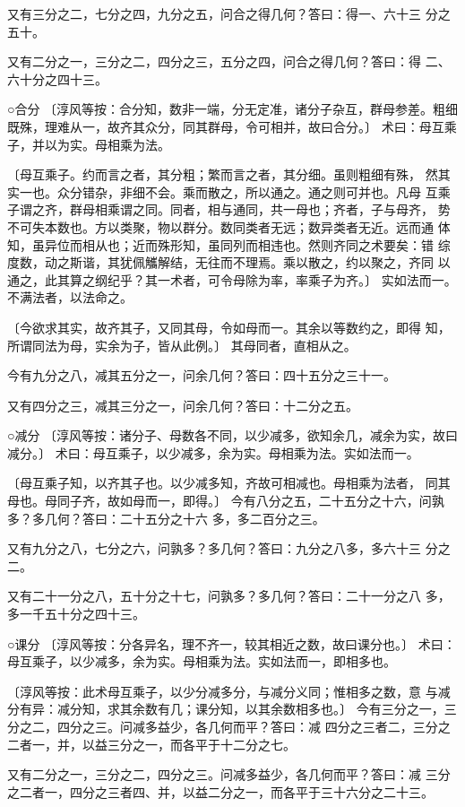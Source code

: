 \documentclass[a4paper,12pt,UTF8,twoside]{ctexbook}
\begin{document}
又有三分之二，七分之四，九分之五，问合之得几何？答曰：得一、六十三 分之五十。

又有二分之一，三分之二，四分之三，五分之四，问合之得几何？答曰：得 二、六十分之四十三。

○合分 〔淳风等按：合分知，数非一端，分无定准，诸分子杂互，群母参差。粗细 既殊，理难从一，故齐其众分，同其群母，令可相并，故曰合分。〕 术曰：母互乘子，并以为实。母相乘为法。

〔母互乘子。约而言之者，其分粗；繁而言之者，其分细。虽则粗细有殊， 然其实一也。众分错杂，非细不会。乘而散之，所以通之。通之则可并也。凡母 互乘子谓之齐，群母相乘谓之同。同者，相与通同，共一母也；齐者，子与母齐， 势不可失本数也。方以类聚，物以群分。数同类者无远；数异类者无近。远而通 体知，虽异位而相从也；近而殊形知，虽同列而相违也。然则齐同之术要矣：错 综度数，动之斯谐，其犹佩觿解结，无往而不理焉。乘以散之，约以聚之，齐同 以通之，此其算之纲纪乎？其一术者，可令母除为率，率乘子为齐。〕 实如法而一。不满法者，以法命之。

〔今欲求其实，故齐其子，又同其母，令如母而一。其余以等数约之，即得 知，所谓同法为母，实余为子，皆从此例。〕 其母同者，直相从之。

今有九分之八，减其五分之一，问余几何？答曰：四十五分之三十一。

又有四分之三，减其三分之一，问余几何？答曰：十二分之五。

○减分 〔淳风等按：诸分子、母数各不同，以少减多，欲知余几，减余为实，故曰 减分。〕 术曰：母互乘子，以少减多，余为实。母相乘为法。实如法而一。

〔母互乘子知，以齐其子也。以少减多知，齐故可相减也。母相乘为法者， 同其母也。母同子齐，故如母而一，即得。〕 今有八分之五，二十五分之十六，问孰多？多几何？答曰：二十五分之十六 多，多二百分之三。

又有九分之八，七分之六，问孰多？多几何？答曰：九分之八多，多六十三 分之二。

又有二十一分之八，五十分之十七，问孰多？多几何？答曰：二十一分之八 多，多一千五十分之四十三。

○课分 〔淳风等按：分各异名，理不齐一，较其相近之数，故曰课分也。〕 术曰：母互乘子，以少减多，余为实。母相乘为法。实如法而一，即相多也。

〔淳风等按：此术母互乘子，以少分减多分，与减分义同；惟相多之数，意 与减分有异：减分知，求其余数有几；课分知，以其余数相多也。〕 今有三分之一，三分之二，四分之三。问减多益少，各几何而平？答曰：减 四分之三者二，三分之二者一，并，以益三分之一，而各平于十二分之七。

又有二分之一，三分之二，四分之三。问减多益少，各几何而平？答曰：减 三分之二者一，四分之三者四、并，以益二分之一，而各平于三十六分之二十三。
\end{document}
